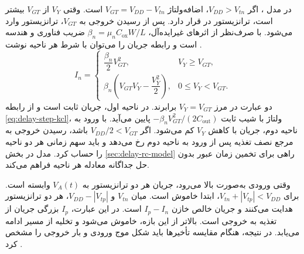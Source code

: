 در مدل ، اگر
\(V_{DD}>V_{tn}\)، اضافه‌ولتاژ \(V_{GT}=V_{DD}-V_{tn}\) است.
وقتی \(V_Y\) از \(V_{GT}\) بیشتر است، ترانزیستور در 
قرار دارد. پس از رسیدن خروجی به \(V_{GT}\)، ترانزیستور وارد
 می‌شود. با صرف‌نظر از اثرهای غیرایده‌آل،
\(\beta_n=\mu_n C_{\mathrm{ox}}W/L\) ضریب فناوری و هندسه است و
رابطه جریان را می‌توان با شرط هر ناحیه نوشت \cite[رابطه
، صفحه ۱۴۴]{weste}.
\begin{equation}
  \label{eq:delay-step-current}
  I_n=
  \begin{cases}
    \dfrac{\beta_n}{2}V_{GT}^{2},
      & V_Y\ge V_{GT},\\[3pt]
    \beta_n\left(V_{GT}V_Y-\dfrac{V_Y^2}{2}\right),
      & 0\le V_Y<V_{GT}.
  \end{cases}
\end{equation}
دو عبارت در مرز \(V_Y=V_{GT}\) برابرند. در ناحیه اول، جریان
ثابت است و از رابطه \eqref{eq:delay-step-kcl}، ولتاژ با شیب ثابت
\(-\beta_n V_{GT}^2/(2C_{\mathrm{out}})\) پایین می‌آید. با ورود به
ناحیه دوم، جریان با کاهش \(V_Y\) کم می‌شود. اگر
\(V_{DD}/2<V_{GT}\) باشد، رسیدن خروجی به مرجع نصف تغذیه پس از
ورود به ناحیه دوم رخ می‌دهد و باید سهم زمانی هر دو ناحیه را حساب کرد.
مدل  در بخش \ref{sec:delay-rc-model} راهی برای تخمین زمان
عبور بدون حل جداگانه معادله هر ناحیه فراهم می‌کند.

وقتی ورودی به‌صورت  بالا می‌رود، جریان هر دو ترانزیستور
به \(V_A(t)\) وابسته است. برای \(V_{tn}+|V_{tp}|<V_{DD}\)، ابتدا
 خاموش است. میان \(V_{tn}\) و \(V_{DD}-|V_{tp}|\)،
هر دو ترانزیستور هدایت می‌کنند و جریان خالص خازن \(I_p-I_n\) است.
در این عبارت، \(I_p\) بزرگی جریان از تغذیه به خروجی است. بالاتر از
این بازه،  خاموش می‌شود و تخلیه از مسیر  ادامه
می‌یابد. در نتیجه، هنگام مقایسه تأخیرها باید شکل موج ورودی و بار
خروجی را مشخص کرد \cite[بخش  و جدول
، صفحات ۱۴۵ و ۱۴۶]{weste}.
